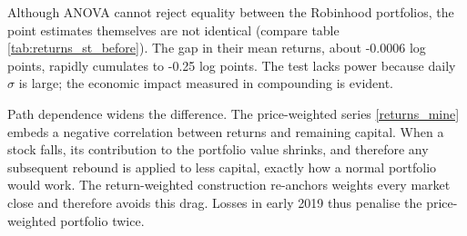 Although ANOVA cannot reject equality between the Robinhood portfolios, the point estimates themselves are not identical (compare table \ref{tab:returns_st_before}).
The gap in their mean returns, about -0.0006 log points, rapidly cumulates to -0.25 log points. 
The test lacks power because daily $\sigma$ is large; the economic impact measured in compounding is evident.

Path dependence widens the difference.
The price-weighted series \ref{returns_mine} embeds a negative correlation between returns and remaining capital.
When a stock falls, its contribution to the portfolio value shrinks, and therefore any subsequent rebound is applied to less capital, exactly how a normal portfolio would work. 
The return-weighted construction re-anchors weights every market close and therefore avoids this drag.
Losses in early 2019 thus penalise the price-weighted portfolio twice.  





